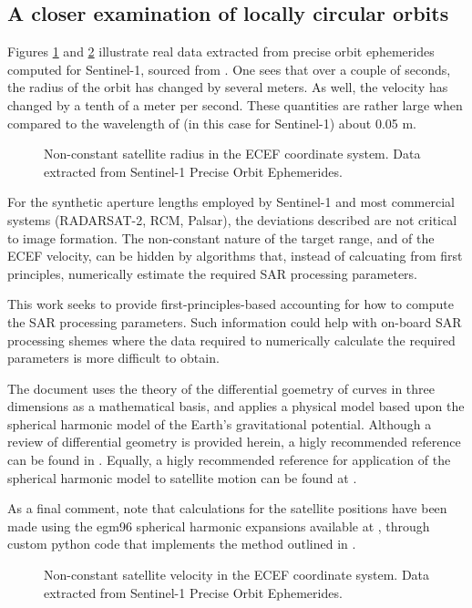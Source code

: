 \subsection{A closer examination of locally circular orbits}
Figures \ref{fg:ECEFRange} and \ref{fg:ECEFVelocity} illustrate real data extracted from precise orbit ephemerides computed for Sentinel-1, sourced from \cite{SentinelPOD}. One sees that over a couple of seconds, the radius of the orbit has changed by several meters. As well, the velocity has changed by a tenth of a meter per second. These quantities are rather large when compared to the wavelength of (in this case for Sentinel-1) about 0.05 m.
\begin{figure}
    \resizebox{\textwidth}{!}{}
	\caption{Non-constant satellite radius in the ECEF coordinate system. Data extracted from Sentinel-1 Precise Orbit Ephemerides.}
	\label{fg:ECEFRange}
\end{figure}
\par
For the synthetic aperture lengths employed by Sentinel-1 and most commercial systems (RADARSAT-2, RCM, Palsar), the deviations described are not critical to image formation. The non-constant nature of the target range, and of the ECEF velocity, can be hidden by algorithms that, instead of calcuating from first principles, numerically estimate the required SAR processing parameters. 
\par
This work seeks to provide first-principles-based accounting for how to compute the SAR processing parameters. Such information could help with on-board SAR processing shemes where the data required to numerically calculate the required parameters is more difficult to obtain. 
\par
The document uses the theory of the differential goemetry of curves in three dimensions as a mathematical basis, and applies a physical model based upon the spherical harmonic model of the Earth's gravitational potential. Although a review of differential geometry is provided herein, a higly recommended reference can be found in \cite{WoodDiffGeo}. Equally, a higly recommended reference for application of the spherical harmonic model to satellite motion can be found at \cite{Shou2014}. 
\par
As a final comment, note that calculations for the satellite positions have been made using the egm96 spherical harmonic expansions available at \cite{NASAEGM86}, through custom python code that implements the method outlined in \cite{Shou2014}. 
\begin{figure}
    \resizebox{\textwidth}{!}{}
	\caption{Non-constant satellite velocity in the ECEF coordinate system. Data extracted from Sentinel-1 Precise Orbit Ephemerides.}
	\label{fg:ECEFVelocity}
\end{figure}
\clearpage
